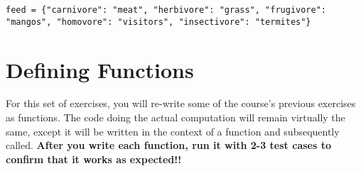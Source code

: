 \documentclass{article}[12pt]
\newcommand{\code}[1]{\texttt{#1}}  %
\begin{document}
\begin{enumerate}
	    \code{feed = \{"carnivore": "meat", "herbivore": "grass", "frugivore": "mangos", "homovore": "visitors", "insectivore": "termites"\} } \\


\end{enumerate}


\section{Defining Functions}

For this set of exercises, you will re-write some of the course's previous exercises as functions. The code doing the actual computation will remain virtually the same, except it will be written in the context of a function and subsequently called. \textbf{ After you write each function, run it with 2-3 test cases to confirm that it works as expected!!}
\end{document}
